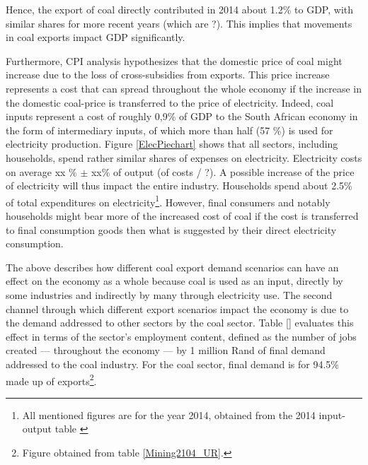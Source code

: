 \documentclass[12pt,english]{article}
\begin{document}
Hence, the export of coal directly contributed in 2014 about 1.2\% to GDP, with similar shares for more recent years (which are ?). This implies that movements in coal exports impact GDP significantly. 

Furthermore, CPI analysis hypothesizes that the domestic price of coal might increase due to the loss of cross-subsidies from exports. This price increase represents a cost that can spread throughout the whole economy if the increase in the domestic coal-price is transferred to the price of electricity. Indeed, coal inputs represent a cost of roughly 0,9\% of GDP to the South African economy in the form of intermediary inputs, of which more than half (57 \%) is used for electricity production. %
Figure \ref{ElecPiechart} shows that all sectors, including households, spend rather similar shares of expenses on electricity.%
Electricity costs on average xx \% $\pm$ xx\% of output (of costs / ?). %
A possible increase of the price of electricity will thus impact the entire industry. Households spend about 2.5\% of total expenditures on electricity\footnote{All mentioned figures are for the year 2014, obtained from the 2014 input-output table \citep{IOT2014}}. However, %
final consumers and notably households might bear more of the increased cost of coal if the cost is transferred to final consumption goods then what is suggested by their direct electricity consumption.





The above describes how different coal export demand scenarios can have an effect on the economy as a whole because coal is used as an input, directly by some industries and indirectly by many through electricity use. The second channel through which different export scenarios impact the economy is due to the demand addressed to other sectors by the coal sector. Table \ref{} evaluates this effect in terms of the sector's employment content, defined as the number of jobs created --- throughout the economy --- by 1 million Rand of final demand addressed to the coal industry. For the coal sector, final demand is for 94.5\% made up of exports\footnote{Figure obtained from table \ref{Mining2104_UR}.}. 
\end{document}
